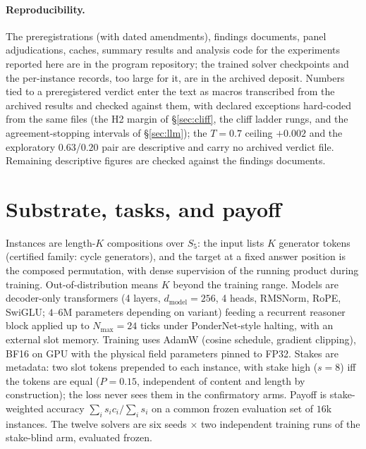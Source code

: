 \documentclass{article}
\newcommand{\LLMtechoTbaja}{$+0.002$}
\newcommand{\VtresCorr}{$0.63$} \newcommand{\VtresCorrBase}{$0.20$}
\begin{document}
\paragraph{Reproducibility.} The preregistrations (with dated amendments),
findings documents, panel adjudications, caches, summary results and analysis
code for the experiments reported here are in the program repository; the
trained solver checkpoints and the per-instance records, too large for it, are
in the archived deposit. Numbers tied to a preregistered
verdict enter the text as macros transcribed from the archived results and
checked against them, with declared exceptions hard-coded from the same files
(the H2 margin of \S\ref{sec:cliff}, the cliff ladder rungs, and the
agreement-stopping intervals of \S\ref{sec:llm}); the $T{=}0.7$ ceiling
\LLMtechoTbaja{} and the exploratory \VtresCorr{}/\VtresCorrBase{} pair are
descriptive and carry no archived verdict file. Remaining descriptive figures
are checked against the findings documents.


\appendix
\section{Substrate, tasks, and payoff}\label{app:setup}
Instances are length-$K$ compositions over $S_5$: the input lists $K$
generator tokens (certified family: cycle generators), and the target at a
fixed answer position is the composed permutation, with dense supervision
of the running product during training. Out-of-distribution means $K$
beyond the training range. Models are decoder-only transformers
(4 layers, $d_{\mathrm{model}}{=}256$, 4 heads, RMSNorm, RoPE, SwiGLU;
$4$--$6$M parameters depending on variant) feeding a recurrent reasoner
block applied up to $N_{\max}{=}24$ ticks under PonderNet-style halting,
with an external slot memory. Training uses AdamW (cosine schedule,
gradient clipping), BF16 on GPU with the physical field parameters pinned
to FP32. Stakes are metadata: two slot tokens prepended to each instance,
with stake high ($s{=}8$) iff the tokens are equal ($P{=}0.15$,
independent of content and length by construction); the loss never sees
them in the confirmatory arms. Payoff is stake-weighted accuracy
$\sum_i s_i c_i / \sum_i s_i$ on a common frozen evaluation set of $16$k
instances. The twelve solvers are six seeds $\times$ two independent
training runs of the stake-blind arm, evaluated frozen.
\end{document}
